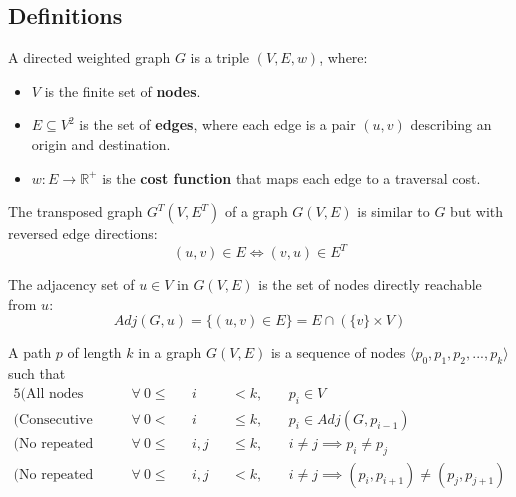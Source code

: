 \subsection{Definitions}
\begin{definition}
    A directed weighted graph $G$ is a triple $(V, E, w)$, where:
    \begin{itemize}
        \item $V$ is the finite set of \textbf{nodes}.
        \item $E \subseteq V^2$ is the set of \textbf{edges}, where each edge is a pair $(u,v)$ describing an origin and destination.
        \item $w: E \rightarrow \mathbb{R}^+$ is the \textbf{cost function} that maps each edge to a traversal cost.
    \end{itemize}
\end{definition}
\begin{definition}
    The transposed graph $G^T(V, E^T)$ of a graph $G(V, E)$ is similar to $G$ but with reversed edge directions:
    \begin{equation*}
        (u, v) \in E \iff (v, u) \in E^T
    \end{equation*}
\end{definition}
\begin{definition}
    The adjacency set of $u \in V$ in $G(V,E)$ is the set of nodes directly reachable from $u$:
    \begin{equation*}
        Adj(G, u) = \{(u, v) \in E\} = E \cap (\{v\}\times V)
    \end{equation*}
\end{definition}
\begin{definition}[Path]
    A path $p$ of length $k$ in a graph $G(V,E)$ is a sequence of nodes $\langle p_0,p_1,p_2,...,p_k\rangle$ such that
    \begin{alignat*}{5}
        \text{(All nodes belong to the graph)}       ~~&\forall~0 \leq &&i   &&<    k,&&~p_i \in V \\
        \text{(Consecutive nodes are adjacent)}~~&\forall~0 <    &&i   &&\leq k,&&~p_i \in Adj(G, p_{i-1})\\
        \text{(No repeated nodes)}                   ~~&\forall~0 \leq &&i,j &&\leq k,&&~i\neq j \implies p_i \neq p_j \\
        \text{(No repeated edges)}                   ~~&\forall~0 \leq &&i,j &&<    k,&&~i\neq j \implies (p_i,p_{i+1}) \neq (p_j, p_{j+1})
    \end{alignat*}
\end{definition}
